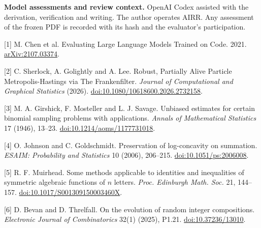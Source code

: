\documentclass[11pt]{article}
\begin{document}
\textbf{Model assessments and review context.} OpenAI Codex assisted with the derivation, verification and writing. The author operates AIRR. Any assessment of the frozen PDF is recorded with its hash and the evaluator's participation.

\small
[1] M. Chen et al. Evaluating Large Language Models Trained on Code. 2021. \href{https://arxiv.org/abs/2107.03374}{arXiv:2107.03374}.

[2] C. Sherlock, A. Golightly and A. Lee. Robust, Partially Alive Particle Metropolis-Hastings via The Frankenfilter. \emph{Journal of Computational and Graphical Statistics} (2026). \href{https://doi.org/10.1080/10618600.2026.2732158}{doi:10.1080/10618600.2026.2732158}.

[3] M. A. Girshick, F. Mosteller and L. J. Savage. Unbiased estimates for certain binomial sampling problems with applications. \emph{Annals of Mathematical Statistics} 17 (1946), 13--23. \href{https://doi.org/10.1214/aoms/1177731018}{doi:10.1214/aoms/1177731018}.

[4] O. Johnson and C. Goldschmidt. Preservation of log-concavity on summation. \emph{ESAIM: Probability and Statistics} 10 (2006), 206--215. \href{https://doi.org/10.1051/ps:2006008}{doi:10.1051/ps:2006008}.

[5] R. F. Muirhead. Some methods applicable to identities and inequalities of symmetric algebraic functions of $n$ letters. \emph{Proc. Edinburgh Math. Soc.} 21, 144--157. \href{https://doi.org/10.1017/S001309150003460X}{doi:10.1017/S001309150003460X}.

[6] D. Bevan and D. Threlfall. On the evolution of random integer compositions. \emph{Electronic Journal of Combinatorics} 32(1) (2025), P1.21. \href{https://doi.org/10.37236/13010}{doi:10.37236/13010}.
\end{document}
